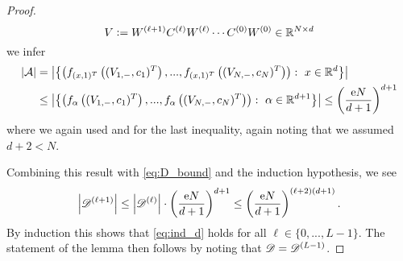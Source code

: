 \begin{proof}
\begin{equation*}
V \mathrel{\mathop:}= W^{(\ell + 1)}C^{(\ell)}W^{(\ell)} \cdots C^{(0)}W^{(0)} \in \mathbb{R}^{N \times d} 
\end{equation*}
we infer
\begin{align*}
\abs{\mathcal{A}} &= \left\vert \left\{ \left(f_{(x,1)^T}\left((V_{1,-}, c_{1})^T\right),..., f_{(x,1)^T}\left((V_{N,-}, c_{N})^T\right)\right): \ x \in \RR^d\right\}\right\vert \\
&\leq \left\vert \left\{ \left(f_{\alpha}\left((V_{1,-}, c_{1})^T\right),..., f_{\alpha}\left((V_{N,-}, c_{N})^T\right)\right): \ \alpha \in \RR^{d+1}\right\}\right\vert \leq \left(\frac{\ee N}{d+1}\right)^{d+1}
\end{align*}
where we again used \cite[Lemma 6.10]{shalev2014understanding} and  for the last inequality, again noting that we assumed $d+2 < N$. 

Combining this result with \eqref{eq:D_bound} and the induction hypothesis, we see
\begin{equation*}
\left\lvert\mathscr{D}^{(\ell+1)}\right\rvert \leq \left\lvert\mathscr{D}^{(\ell)}\right\rvert \cdot \left(\frac{\mathrm{e} N}{d+1}\right)^{d+1} \leq \left(\frac{\mathrm{e} N}{d+1}\right)^{(\ell + 2)(d+1)}.
\end{equation*}
By induction this shows that \eqref{eq:ind_d} holds for all $\ell \in \{0,...,L-1\}$. The statement of the lemma then follows by noting that $\mathscr{D} = \mathscr{D}^{(L-1)}$.
\end{proof}

